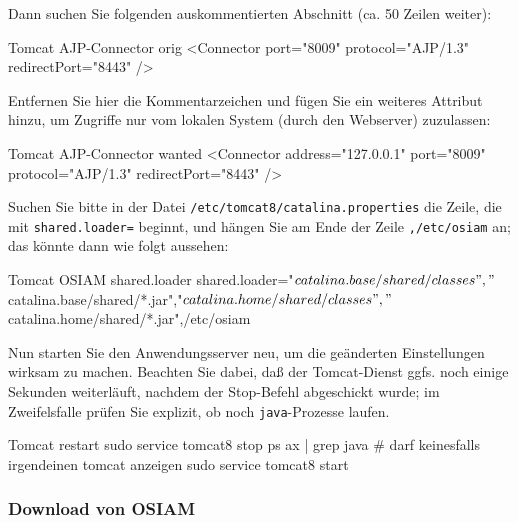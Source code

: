 \documentclass{tarentanleitung}
\begin{document}
\begin{minipage}{\linewidth}
Dann suchen Sie folgenden auskommentierten Abschnitt (ca. 50 Zeilen weiter):

\begin{lstdump}[language=XML]{Tomcat AJP-Connector orig}
<Connector port="8009" protocol="AJP/1.3" redirectPort="8443" />
\end{lstdump}

Entfernen Sie hier die Kommentarzeichen und fügen Sie ein weiteres Attribut
hinzu, um Zugriffe nur vom lokalen System (durch den Webserver) zuzulassen:

\begin{lstdump}[language=XML]{Tomcat AJP-Connector wanted}
<Connector address="127.0.0.1" port="8009" protocol="AJP/1.3" redirectPort="8443" />
\end{lstdump}
\end{minipage}

\begin{minipage}{\linewidth}
Suchen Sie bitte in der Datei \texttt{/etc/tomcat8/catalina.properties}
die Zeile, die mit \texttt{shared.loader=} beginnt, und hängen Sie am
Ende der Zeile \texttt{,/etc/osiam} an; das könnte dann wie folgt aussehen:

\begin{lstdump}{Tomcat OSIAM shared.loader}
shared.loader="${catalina.base}/shared/classes","${catalina.base}/shared/*.jar","${catalina.home}/shared/classes","${catalina.home}/shared/*.jar",/etc/osiam
\end{lstdump}
\end{minipage}

Nun starten Sie den Anwendungsserver neu, um die geänderten
Einstellungen wirksam zu machen. Beachten Sie dabei, daß der
Tomcat-Dienst ggfs. noch einige Sekunden weiterläuft, nachdem
der Stop-Befehl abgeschickt wurde; im Zweifelsfalle prüfen Sie
explizit, ob noch \texttt{java}-Prozesse laufen.\keinumbruch

\begin{minipage}{\linewidth}
\begin{lstdump}{Tomcat restart}
sudo service tomcat8 stop
ps ax | grep java               # darf keinesfalls irgendeinen tomcat anzeigen
sudo service tomcat8 start
\end{lstdump}
\end{minipage}

\subsubsection{Download von OSIAM}\label{subsubsec:setup-osiam-download}
\end{document}
